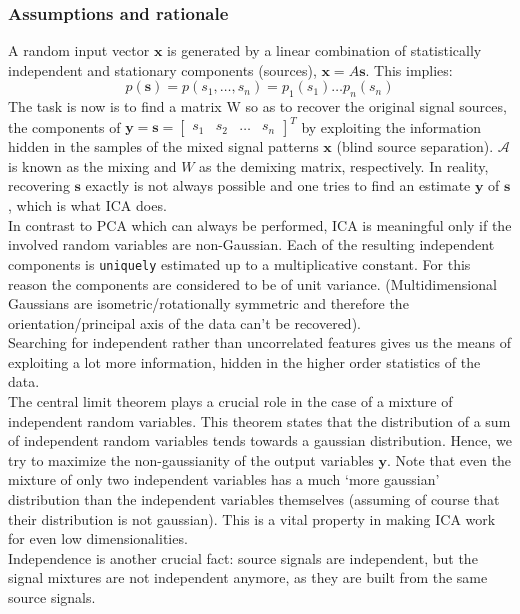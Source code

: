 \documentclass[11pt]{article}
\begin{document}
\subsubsection{Assumptions and rationale} A random input vector $\mathbf{x}$ is generated by a linear combination of statistically independent and stationary components (sources), $\mathbf{x}=A\mathbf{s}$. This implies:
\[p(\mathbf{s})=p(s_1,\dots,s_n)=p_1(s_1)\dots p_n(s_n)\]
The task is now is to find a matrix W so as to recover the original signal sources, the components of $\mathbf{y}= \mathbf{s} = \begin{bmatrix}s_1 & s_2 & \dots & s_n\end{bmatrix}^T$ by exploiting the information hidden in the samples of the mixed signal patterns $\mathbf{x}$ (blind source separation). $\mathcal{A}$ is known as the mixing and $W$ as the demixing matrix, respectively. In reality, recovering $\mathbf{s}$ exactly is not always possible and one tries to find an estimate  $\mathbf{y}$ of $\mathbf{s}$, which is what ICA does.\\
In contrast to PCA which can always be performed, ICA is meaningful only if the involved random variables are non-Gaussian. Each of the resulting independent components is \texttt{uniquely} estimated up to a multiplicative constant. For this reason the components are considered to be of unit variance. (Multidimensional Gaussians are isometric/rotationally symmetric and therefore the orientation/principal axis of the data can't be recovered). %
\\Searching for independent rather than uncorrelated features gives us the means of exploiting a lot more information, hidden in the higher order statistics of the data.
\\The central limit theorem plays a crucial role in the case of a mixture of independent random variables. This theorem states that the distribution of a sum of independent random variables tends towards a gaussian distribution. Hence, we try to maximize the non-gaussianity of the output variables $\mathbf{y}$. Note that even the mixture of only two independent variables has a much `more gaussian' distribution than the independent variables themselves (assuming of course that their distribution is not gaussian). This is a vital property in making ICA work for even low dimensionalities.
\\Independence is another crucial fact: source signals are independent, but the signal mixtures are not independent anymore, as they are built from the same source signals.
\end{document}

